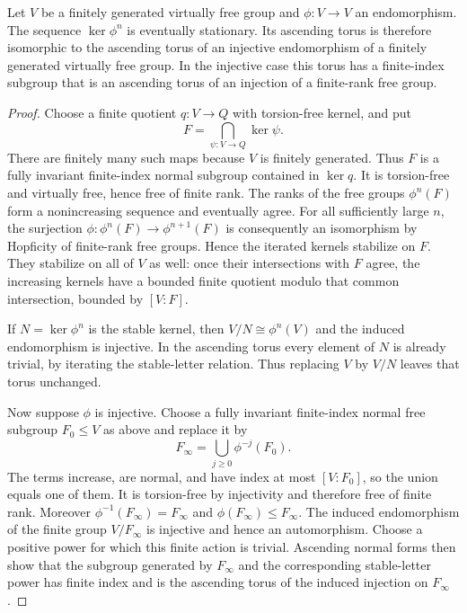 \begin{lemma}\label{close:virtually-free-endo}
Let $V$ be a finitely generated virtually free group and
$\phi:V\to V$ an endomorphism. The sequence $\ker\phi^n$ is eventually
stationary. Its ascending torus is therefore isomorphic to the
ascending torus of an injective endomorphism of a finitely generated
virtually free group. In the injective case this torus has a
finite-index subgroup that is an ascending torus of an injection of a
finite-rank free group.
\end{lemma}

\begin{proof}
Choose a finite quotient $q:V\to Q$ with torsion-free kernel, and put
\[
 F=\bigcap_{\psi:V\to Q}\ker\psi.
\]
There are finitely many such maps because $V$ is finitely generated.
Thus $F$ is a fully invariant finite-index normal subgroup contained
in $\ker q$. It is torsion-free and virtually free, hence free of
finite rank. The ranks of the free groups $\phi^n(F)$ form a
nonincreasing sequence and eventually agree. For all sufficiently
large $n$, the surjection
$\phi:\phi^n(F)\to\phi^{n+1}(F)$ is consequently an isomorphism by
Hopficity of finite-rank free groups. Hence the iterated kernels
stabilize on $F$. They stabilize on all of $V$ as well: once their
intersections with $F$ agree, the increasing kernels have a bounded
finite quotient modulo that common intersection, bounded by $[V:F]$.

If $N=\ker\phi^n$ is the stable kernel, then
$V/N\cong\phi^n(V)$ and the induced endomorphism is injective. In the
ascending torus every element of $N$ is already trivial, by iterating
the stable-letter relation. Thus replacing $V$ by $V/N$ leaves that
torus unchanged.

Now suppose $\phi$ is injective. Choose a fully invariant finite-index
normal free subgroup $F_0\le V$ as above and replace it by
\[
 F_\infty=\bigcup_{j\ge0}\phi^{-j}(F_0).
\]
The terms increase, are normal, and have index at most $[V:F_0]$, so
the union equals one of them. It is torsion-free by injectivity and
therefore free of finite rank. Moreover
$\phi^{-1}(F_\infty)=F_\infty$ and
$\phi(F_\infty)\le F_\infty$. The induced endomorphism of the finite
group $V/F_\infty$ is injective and hence an automorphism. Choose a
positive power for which this finite action is trivial. Ascending
normal forms then show that the subgroup generated by $F_\infty$ and
the corresponding stable-letter power has finite index and is the
ascending torus of the induced injection on $F_\infty$.
\end{proof}

